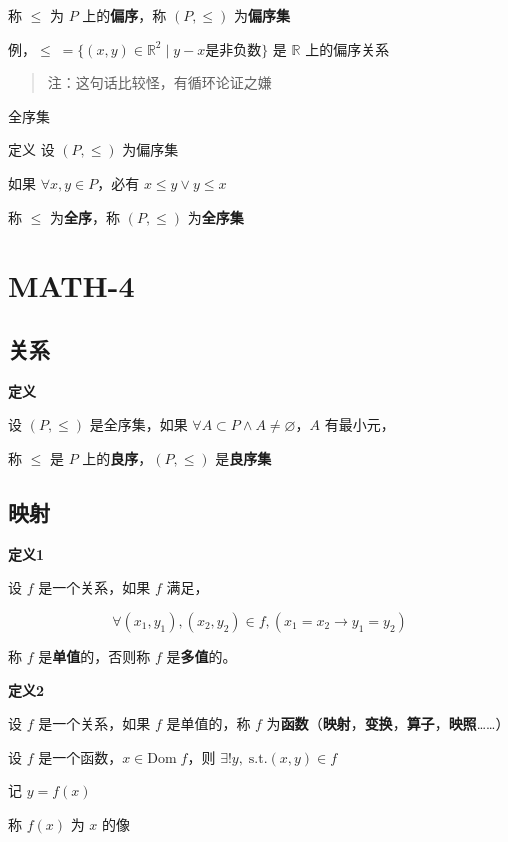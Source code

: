 称 \(\le\) 为 \(P\) 上的\textbf{偏序}，称 \((P, \le)\) 为\textbf{偏序集}

例，\(\le\; = \{(x, y)\in \mathbb{R} ^2 \mid y-x\text{是非负数}\}\) 是
\(\mathbb{R}\) 上的偏序关系

\begin{quote}
注：这句话比较怪，有循环论证之嫌
\end{quote}

全序集

定义 设 \((P, \le)\) 为偏序集

如果 \(\forall x, y \in P\)，必有 \(x\le y \vee y \le x\)

称 \(\le\) 为\textbf{全序}，称 \((P, \le)\) 为\textbf{全序集}

\section{MATH-4}\label{math-4}

\subsection{关系}\label{ux5173ux7cfb-2}

\textbf{定义}

设 \((P, \leq)\) 是全序集，如果
\(\forall A \subset P \wedge A \neq \varnothing\)，\(A\) 有最小元，

称 \(\leq\) 是 \(P\) 上的\textbf{良序}，\((P, \leq)\) 是\textbf{良序集}

\subsection{映射}\label{ux6620ux5c04}

\textbf{定义1}

设 \(f\) 是一个关系，如果 \(f\) 满足，

\[
\forall (x_{1}, y_{1}), (x_{2}, y_{2})\in f, (x_{1}=x_{2}\to y_{1}=y_{2})
\]

称 \(f\) 是\textbf{单值}的，否则称 \(f\) 是\textbf{多值}的。

\textbf{定义2}

设 \(f\) 是一个关系，如果 \(f\) 是单值的，称 \(f\)
为\textbf{函数}（\textbf{映射}，\textbf{变换}，\textbf{算子}，\textbf{映照}\ldots\ldots）

设 \(f\) 是一个函数，\(x\in \mathrm{Dom} \; f\)，则
\(\exists ! y, \; \text{s.t.} (x, y) \in f\)

记 \(y=f(x)\)

称 \(f(x)\) 为 \(x\) 的像

